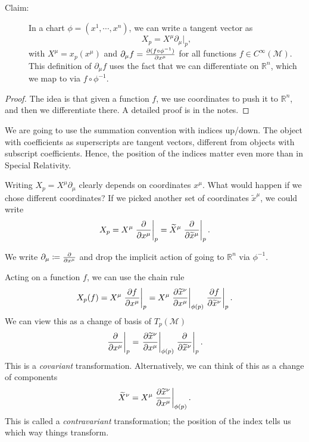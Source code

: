 \begin{description}
  \item[Claim:] In a chart $\phi= (x^1, \cdots, x^n)$, we can write a tangent vector as
    \begin{equation}
      X_p = X^\mu \partial_\mu \rvert_p,
    \end{equation}
    with $X^\mu = x_p(x^\mu)$ and $\partial_\mu f = \pdv{(f \circ \phi^{-1})}{x^\mu}$ for all functions $f \in C^\infty(\mathcal{M})$. This definition of $\partial_\mu f$ uses the fact that we can differentiate on $\mathbb{R}^n$, which we map to via $f \circ \phi^{-1}$.
\end{description}
\begin{proof}
  The idea is that given a function $f$, we use coordinates to push it to $\mathbb{R}^n$, and then we differentiate there.
  A detailed proof is in the notes.
\end{proof}

\begin{leftbar}
  \begin{remark}
    We are going to use the summation convention with indices up/down.
    The object with coefficients as superscripts are tangent vectors, different from objects with subscript coefficients. Hence, the position of the indices matter even more than in Special Relativity.
  \end{remark}
\end{leftbar}

Writing $X_p = X^\mu \partial_\mu$ clearly depends on coordinates $x^\mu$. What would happen if we chose different coordinates?
If we picked another set of coordinates $\widetilde x^\mu$, we could write
\begin{equation}
  X_p = X^\mu \left.\pdv{}{x^\mu}\right\rvert_p = \widetilde X^\mu \left.\pdv{}{\widetilde x^\mu}\right\rvert_p.
\end{equation}

\begin{notation}[]
  We write $\partial_\mu \coloneqq \pdv{}{x^\mu}$ and drop the implicit action of going to $\mathbb{R}^n$ via $\phi^{-1}$.
\end{notation}

Acting on a function $f$, we can use the chain rule
\begin{equation}
  X_p(f) = X^\mu \left.\pdv{f}{x^\mu} \right\rvert_p = X^\mu \left.\pdv{\widetilde x^\nu}{x^\mu} \right\rvert_{\phi(p)} \left.\pdv{f}{\widetilde x^\nu} \right\rvert_p.
\end{equation}
We can view this as a change of basis of $T_p(\mathcal{M})$
\begin{equation}
\left. \pdv{}{x^\mu} \right\rvert_p = \left.\pdv{\widetilde x^\nu}{x^\mu}\right\rvert_{\phi(p)} \left.\pdv{}{\widetilde x^\nu} \right\rvert_p.
\end{equation}
This is a \emph{covariant} transformation.
Alternatively, we can think of this as a change of components
\begin{equation}
  \widetilde X^\nu = X^\mu \left.\pdv{\widetilde x^\nu}{x^\mu} \right\rvert_{\phi(p)}.
\end{equation}
This is called a \emph{contravariant} transformation; the position of the index tells us which way things transform.

